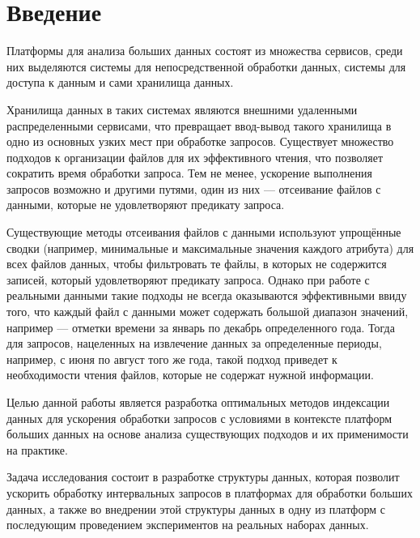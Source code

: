 \section*{Введение}

Платформы для анализа больших данных состоят из множества сервисов, среди них  выделяются системы для непосредственной обработки данных, системы для доступа к данным и сами хранилища данных.

Хранилища данных в таких системах являются внешними удаленными распределенными сервисами, что превращает ввод-вывод такого хранилища в одно из основных узких мест при обработке запросов. Существует множество подходов к организации файлов для их эффективного чтения, что позволяет сократить время  обработки запроса. Тем не менее, ускорение выполнения запросов возможно и другими путями, один из них --- отсеивание файлов с данными, которые не удовлетворяют предикату запроса.

Существующие методы отсеивания файлов с данными используют упрощённые сводки (например, минимальные и максимальные значения каждого атрибута) для всех файлов данных, чтобы фильтровать те файлы, в которых не содержится записей, который удовлетворяют предикату запроса. Однако при работе с реальными данными такие подходы не всегда оказываются эффективными ввиду того, что каждый файл с данными может содержать большой диапазон значений, например --- отметки времени за январь по декабрь определенного года. Тогда для запросов, нацеленных на извлечение данных за определенные периоды, например, с июня по август того же года, такой подход приведет к необходимости чтения файлов, которые не содержат нужной информации.

Целью данной работы является разработка оптимальных методов индексации данных для ускорения обработки запросов с условиями в контексте платформ больших данных на основе анализа существующих подходов и их применимости на практике.

Задача исследования состоит в разработке структуры данных, которая позволит ускорить обработку интервальных запросов в платформах для обработки больших данных, а также во внедрении этой структуры данных в одну из платформ с последующим проведением экспериментов на реальных наборах данных.
